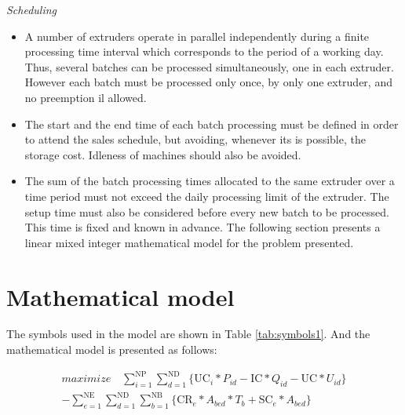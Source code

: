 \emph{Scheduling}

\begin{itemize}
\item A number of extruders operate in parallel independently during a finite processing time interval which corresponds to the period of a working day. Thus, several batches can be processed simultaneously, one in each extruder. However each batch must be processed only once, by only one extruder, and no preemption il allowed. 
\item The start and the end time of each batch processing must be defined in order to attend the sales schedule, but avoiding, whenever its is possible, the storage cost. Idleness of machines should also be avoided.
\item The sum of the batch processing times allocated to the same extruder over a time period must not exceed the daily processing limit of the extruder. The setup time must also be considered before every new batch to be processed. This time is fixed and known in advance. The following section presents a linear mixed integer mathematical model for the problem presented.
\end{itemize}

\section{Mathematical model}

The symbols used in the model are shown in Table \ref{tab:symbols1}. And the mathematical model is
presented as follows:

\begin{eqnarray} 
\label{eq:objFunc}
	 maximize \quad \nonumber
	 \sum_{i=1}^{\mathrm{NP}}{\sum_{d=1}^{\mathrm{ND}}\{\mathrm{UC}_i*P_{id} - \mathrm{IC}*Q_{id}} - \mathrm{UC}*U_{id}\}  \\ 
	 - \sum_{e=1}^{\mathrm{NE}}\sum_{d=1}^{\mathrm{ND}}\sum_{b=1}^{\mathrm{NB}}\{\mathrm{CR}_e*A_{bed}*T_{b} +\mathrm{SC}_e*A_{bed}\}
\end{eqnarray}

